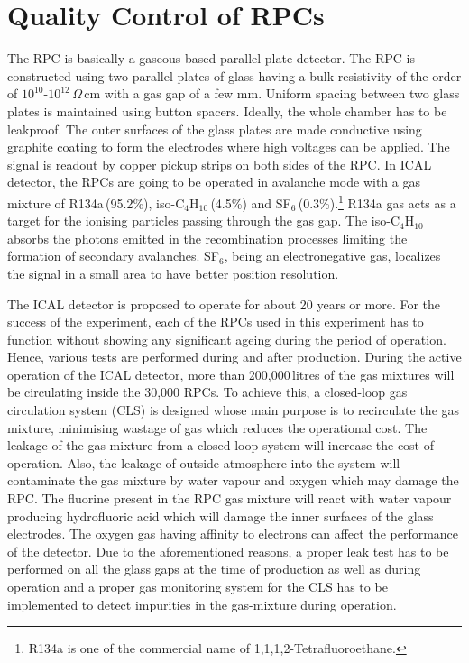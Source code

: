 \documentclass[a4paper,12pt,twoside]{article}
\begin{document}
\section{Quality Control of RPCs}

The RPC is basically a gaseous based parallel-plate detector\cite{rpc_p2}. The RPC is constructed using two parallel plates of glass having a bulk resistivity of the order of $10^{10}$-$10^{12}$\,$\Omega$\,cm with a gas gap of a few mm. Uniform spacing between two glass plates is maintained using button spacers. Ideally, the whole chamber has to be leakproof. The outer surfaces of the glass plates are made conductive using graphite coating to form the electrodes where high voltages can be applied. The signal is readout by copper pickup strips on both sides of the RPC. In ICAL detector, the RPCs are going to be operated in avalanche mode with a gas mixture of R134a\,(95.2\%), iso-C$_4$H$_{10}$\,(4.5\%) and SF$_6$\,(0.3\%).\footnote{R134a is one of the commercial name of 1,1,1,2-Tetrafluoroethane.} R134a gas acts as a target for the ionising particles passing through the gas gap. The iso-C$_4$H$_{10}$ absorbs the photons emitted in the recombination processes limiting the formation of secondary avalanches. SF$_6$, being an electronegative gas, localizes the signal in a small area to have better position resolution.

The ICAL detector is proposed to operate for about 20 years or more. For the success of the experiment, each of the RPCs used in this experiment has to function without showing any significant ageing during the period of operation. Hence, various tests are performed during and after production. During the active operation of the ICAL detector, more than 200,000\,litres of the gas mixtures will be circulating inside the 30,000 RPCs. To achieve this, a closed-loop gas circulation system (CLS) is designed whose main purpose is to recirculate the gas mixture, minimising wastage of gas which reduces the operational cost. The leakage of the gas mixture from a closed-loop system will increase the cost of operation. Also, the leakage of outside atmosphere into the system will contaminate the gas mixture by water vapour and oxygen which may damage the RPC\cite{rpc_c,rpc_w}. The fluorine present in the RPC gas mixture will react with water vapour producing hydrofluoric acid which will damage the inner surfaces of the glass electrodes. The oxygen gas having affinity to electrons can affect the performance of the detector. Due to the aforementioned reasons, a proper leak test has to be performed on all the glass gaps at the time of production as well as during operation and a proper gas monitoring system for the CLS has to be implemented to detect impurities in the gas-mixture during operation.
\end{document}
